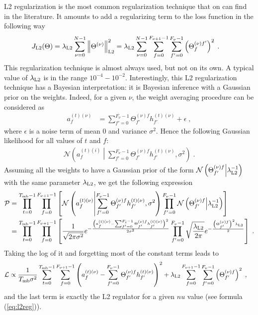 L2 regularization is the most common regularization technique that on can find in the literature. It amounts to add a regularizing term to the loss function in the following way
\begin{align}
J_{{\rm L2}}(\Theta)&=\lambda_{{\rm L2}} \sum_{\nu=0}^{N-1}\left\|\Theta^{(\nu)}\right\|^2_{{\rm L2}}
%
=\lambda_{{\rm L2}}\sum_{\nu=0}^{N-1}\sum_{f=0}^{F_{\nu+1}-1}\sum_{f'=0}^{F_\nu-1}
%
\left(\Theta^{(\nu)f'}_{f}\right)^2\;.\label{eq:l2reg}
\end{align}
This regularization technique is almost always used, but not on its own. A typical value of $\lambda_{{\rm L2}}$ is in the range $10^{-4}-10^{-2}$. Interestingly, this L2 regularization technique has a Bayesian interpretation: it is Bayesian inference with a Gaussian prior on the weights. Indeed, for a given $\nu$, the weight averaging procedure can be considered as
\begin{align}
a_{f}^{(t)(\nu)}&=\sum^{F_\nu-1}_{f'=0}\Theta^{(\nu)f}_{f'}h^{(t)(\nu)}_{f'}+\epsilon\;,
\end{align}
where $\epsilon$ is a noise term of mean $0$ and variance $\sigma^2$. Hence the following Gaussian likelihood for all values of $t$ and $f$:
\begin{align}
\mathcal{N}\left(a_{f}^{(t)(i)}\middle|\sum^{F_\nu-1}_{f'=0}\Theta^{(\nu)f}_{f'}h^{(t)(\nu)}_{f'},\sigma^2\right)\;.
\end{align}
Assuming all the weights to have a Gaussian prior of the form $\mathcal{N}\left(\Theta^{(\nu)f}_{f'}\middle|\lambda_{{\rm L2}}^{-1}\right)$ with the same parameter $\lambda_{{\rm L2}}$, we get the following expression
\begin{align}
\mathcal{P}&=
%
\prod_{t=0}^{T_{{\rm mb}}-1}\prod_{f=0}^{F_{\nu+1}-1}\left[\mathcal{N}\left(a_{f}^{(t)(\nu)}\middle|
%
\sum^{F_\nu-1}_{f'=0}\Theta^{(\nu)f}_{f'}h^{(t)(\nu)}_{f'},\sigma^2\right)
%
\prod_{f'=0}^{F_{\nu}-1}\mathcal{N}\left(\Theta^{(\nu)f}_{f'}
%
\middle|\lambda_{{\rm L2}}^{-1}\right)\right]\notag\\
%
&=\prod_{t=0}^{T_{{\rm mb}}-1}\prod_{f=0}^{F_{\nu+1}-1}\left[\frac{1}{\sqrt{2\pi \sigma^2}}
%
e^{-\frac{\left(a_{f}^{(t)(\nu)}-\sum^{F_i-1}_{f'=0}\Theta^{(\nu)f}_{f'}h^{(t)(\nu)}_{f'}\right)^2}{2\sigma^2}}
%
\prod_{f'=0}^{F_{\nu}-1}\sqrt{\frac{\lambda_{{\rm L2}}}{2\pi}}e^{-\frac{\left(\Theta^{(\nu)f}_{f'}\right)^2\lambda_{{\rm L2}}}{2}}\right] \;.
\end{align}
Taking the log of it and forgetting most of the constant terms leads to
\begin{align}
\mathcal{L}&\propto\frac{1}{T_{{\rm mb}}\sigma^2}
%
\sum_{t=0}^{T_{{\rm mb}}-1}\sum_{f=0}^{F_{\nu+1}-1}
%
\left(a_{f}^{(t)(\nu)}-\sum^{F_\nu-1}_{f'=0}\Theta^{(\nu)f}_{f'}h^{(t)(\nu)}_{f'}\right)^2
%
+\lambda_{{\rm L2}}\sum_{f=0}^{F_{\nu+1}-1}\sum_{f'=0}^{F_{\nu}-1}\left(\Theta^{(\nu)f}_{f'}\right)^2 \;,
\end{align}
and the last term is exactly the L2 regulator for a given $nu$ value (see formula (\ref{eq:l2reg})).

